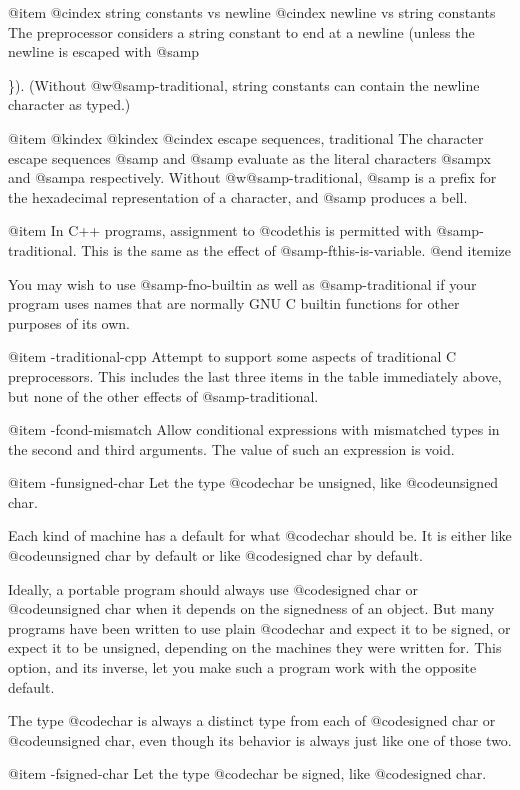@item
@cindex string constants vs newline
@cindex newline vs string constants
The preprocessor considers a string constant to end at a newline (unless
the newline is escaped with @samp{\}).  (Without @w{@samp{-traditional}},
string constants can contain the newline character as typed.)

@item
@kindex \x
@kindex \a
@cindex escape sequences, traditional
The character escape sequences @samp{\x} and @samp{\a} evaluate as the
literal characters @samp{x} and @samp{a} respectively.  Without
@w{@samp{-traditional}}, @samp{\x} is a prefix for the hexadecimal
representation of a character, and @samp{\a} produces a bell.

@item
In C++ programs, assignment to @code{this} is permitted with
@samp{-traditional}.  This is the same as the effect of
@samp{-fthis-is-variable}.
@end itemize

You may wish to use @samp{-fno-builtin} as well as @samp{-traditional}
if your program uses names that are normally GNU C builtin functions for
other purposes of its own.

@item -traditional-cpp
Attempt to support some aspects of traditional C preprocessors.
This includes the last three items in the table immediately above,
but none of the other effects of @samp{-traditional}.

@item -fcond-mismatch
Allow conditional expressions with mismatched types in the second and
third arguments.  The value of such an expression is void.

@item -funsigned-char
Let the type @code{char} be unsigned, like @code{unsigned char}.

Each kind of machine has a default for what @code{char} should
be.  It is either like @code{unsigned char} by default or like
@code{signed char} by default.

Ideally, a portable program should always use @code{signed char} or
@code{unsigned char} when it depends on the signedness of an object.
But many programs have been written to use plain @code{char} and
expect it to be signed, or expect it to be unsigned, depending on the
machines they were written for.  This option, and its inverse, let you
make such a program work with the opposite default.

The type @code{char} is always a distinct type from each of
@code{signed char} or @code{unsigned char}, even though its behavior
is always just like one of those two.

@item -fsigned-char
Let the type @code{char} be signed, like @code{signed char}.

}
